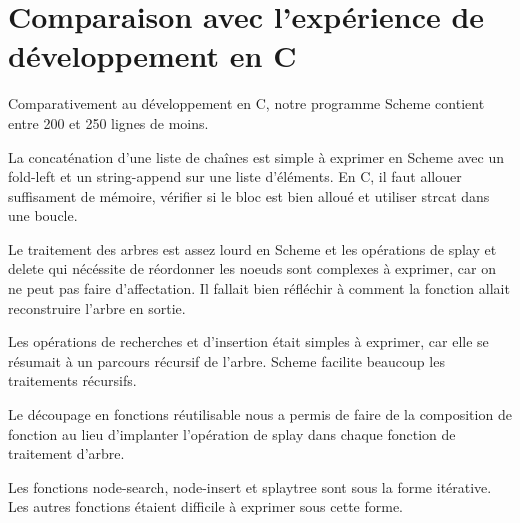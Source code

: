 \documentclass{article}
\begin{document}
  \section{Comparaison avec l'expérience de développement en C}

  Comparativement au développement en C, notre programme Scheme contient entre
  200 et 250 lignes de moins.

  La concaténation d'une liste de chaînes est simple à exprimer en Scheme avec
  un \textsf{fold-left} et un \textsf{string-append} sur une liste d'éléments.
  En C, il faut allouer suffisament de mémoire, vérifier si le bloc est bien
  alloué et utiliser \textsf{strcat} dans une boucle.

  Le traitement des arbres est assez lourd en Scheme et les opérations de splay
  et delete qui nécéssite de réordonner les noeuds sont complexes à exprimer,
  car on ne peut pas faire d'affectation. Il fallait bien réfléchir à comment la
  fonction allait reconstruire l'arbre en sortie.

  Les opérations de recherches et d'insertion était simples à exprimer, car elle
  se résumait à un parcours récursif de l'arbre. Scheme facilite beaucoup les
  traitements récursifs.

  Le découpage en fonctions réutilisable nous a permis de faire de la
  composition de fonction au lieu d'implanter l'opération de splay dans chaque
  fonction de traitement d'arbre.

  Les fonctions \textsf{node-search}, \textsf{node-insert} et \textsf{splaytree}
  sont sous la forme itérative. Les autres fonctions étaient difficile à
  exprimer sous cette forme.
\end{document}
